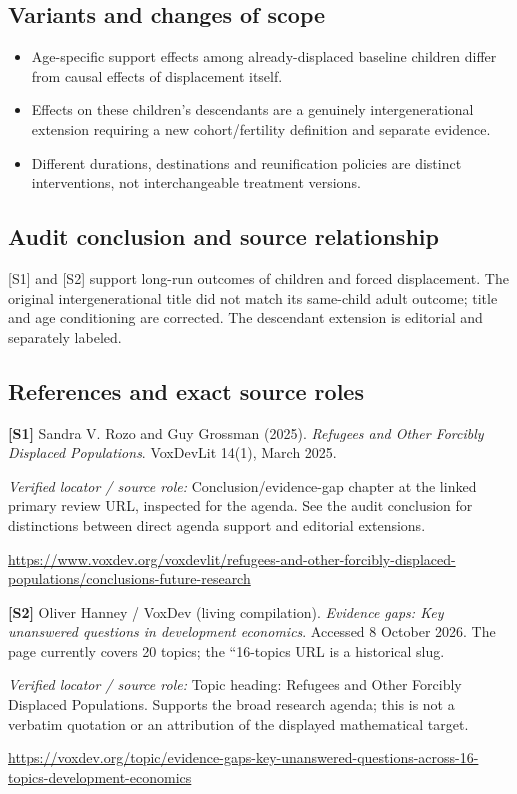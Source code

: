 \documentclass[11pt,a4paper]{article}
\begin{document}
\subsection*{Variants and changes of scope}

\begin{itemize}
\item Age-specific support effects among already-displaced baseline children differ from causal effects of displacement itself.
\item Effects on these children's descendants are a genuinely intergenerational extension requiring a new cohort/fertility definition and separate evidence.
\item Different durations, destinations and reunification policies are distinct interventions, not interchangeable treatment versions.
\end{itemize}

\subsection*{Audit conclusion and source relationship}

[S1] and [S2] support long-run outcomes of children and forced displacement. The original intergenerational title did not match its same-child adult outcome; title and age conditioning are corrected. The descendant extension is editorial and separately labeled.

\subsection*{References and exact source roles}

{\footnotesize\raggedright
\par\noindent\textbf{[S1]} Sandra V. Rozo and Guy Grossman (2025). \emph{Refugees and Other Forcibly Displaced Populations}. VoxDevLit 14(1), March 2025.\par \textit{Verified locator / source role:} Conclusion/evidence-gap chapter at the linked primary review URL, inspected for the agenda. See the audit conclusion for distinctions between direct agenda support and editorial extensions.\par \url{https://www.voxdev.org/voxdevlit/refugees-and-other-forcibly-displaced-populations/conclusions-future-research}\par\smallskip
\par\noindent\textbf{[S2]} Oliver Hanney / VoxDev (living compilation). \emph{Evidence gaps: Key unanswered questions in development economics}. Accessed 8 October 2026. The page currently covers 20 topics; the ``16-topics URL is a historical slug.\par \textit{Verified locator / source role:} Topic heading: Refugees and Other Forcibly Displaced Populations. Supports the broad research agenda; this is not a verbatim quotation or an attribution of the displayed mathematical target.\par \url{https://voxdev.org/topic/evidence-gaps-key-unanswered-questions-across-16-topics-development-economics}\par\smallskip
}
\end{document}

